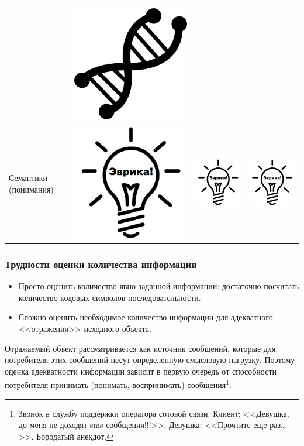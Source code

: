 \begin{frame}
\begin{center}
\begin{tabular}[c]{l|c|c|c|}
                        & \includegraphics[width=.12\textwidth]{fig/frog-code}
                            \\ \hline
            Семантики (понимания)
                & \includegraphics[width=.10\textwidth]{fig/eurika}
                    & \includegraphics[width=.10\textwidth]{fig/eurika}
                        & \includegraphics[width=.10\textwidth]{fig/eurika}
                            \\ \hline
        \end{tabular}
    \end{center}
    
\end{frame}

\begin{frame}
    \frametitle{Трудности оценки количества информации}

    \begin{itemize}
        \item Просто оценить количество явно заданной информации: достаточно посчитать количество кодовых символов последовательности. 
    
        \item Сложно оценить необходимое количество информации для адекватного <<отражения>> исходного объекта.
    \end{itemize}
\end{frame}

Отражаемый объект рассматривается как источник сообщений, которые для потребителя этих сообщений несут определенную смысловую нагрузку. Поэтому оценка адекватности информации зависит в первую очередь от способности потребителя принимать (понимать, воспринимать) сообщения\footnote{Звонок в службу поддержки оператора сотовой связи. Клиент: <<Девушка, до меня не доходят sms сообщения!!!>>.  Девушка: <<Прочтите еще раз\ldots>>. Бородатый анекдот.}. 

